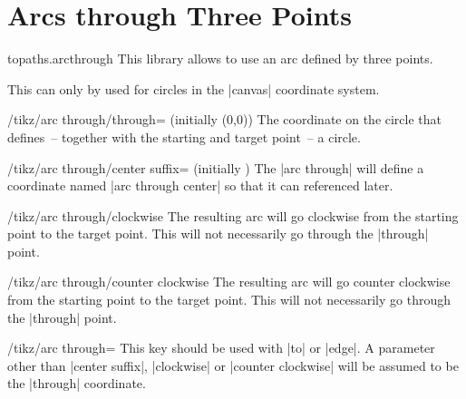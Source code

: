 %
%
%

\section{Arcs through Three Points}
\label{library:topaths.arcthrough}
\begin{tikzlibrary}{topaths.arcthrough}
  This library allows to use an arc defined by three points.
\end{tikzlibrary}

\begin{codeexample}[width=10cm,preamble=\usetikzlibrary{topaths.arcthrough}]
\end{codeexample}

This can only by used for circles in the |canvas| coordinate system.

\begin{key}{/tikz/arc through/through= (initially {(0,0)})}
  The coordinate on the circle that defines~-- together with the
  starting and target point~-- a circle.
\end{key}

\begin{key}{/tikz/arc through/center suffix= (initially {})}
  The |arc through| will define a coordinate named |arc through center|
  so that it can referenced later.
\end{key}

\begin{key}{/tikz/arc through/clockwise}
  The resulting arc will go clockwise from the starting point to the target point.
  This will not necessarily go through the |through| point.
\end{key}

\begin{key}{/tikz/arc through/counter clockwise}
  The resulting arc will go counter clockwise from the starting point to the target point.
  This will not necessarily go through the |through| point.
\end{key}

\begin{key}{/tikz/arc through=}
  This key should be used with |to| or |edge|.
  A parameter other than |center suffix|, |clockwise| or |counter clockwise| will
  be assumed to be the |through| coordinate.
\end{key}
